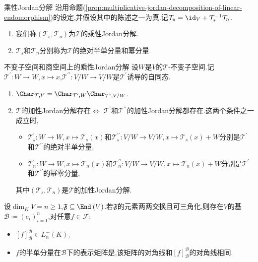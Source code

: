 \begin{definition}{乘性Jordan分解}{}
	沿用命题(\ref{prop:multiplicative-jordan-decomposition-of-linear-endomorphism})的设定,并假设其中的陈述之一为真.记$\mathcal{T}_{u}=\id_{V}+\mathcal{T}_{s}^{-1}\mathcal{T}_{n}$.
	\begin{enumerate}
		\item 我们称$\left(\mathcal{T}_{s},\mathcal{T}_{u}\right)$为$\mathcal{T}$的乘性Jordan分解.
		\item $\mathcal{T}_{s}$和$\mathcal{T}_{n}$分别称为$\mathcal{T}$的绝对半单分量和幂分量.
	\end{enumerate}
\end{definition}

\begin{proposition}{不变子空间和商空间上的乘性Jordan分解}{}
	设$W$是$V$的$\mathcal{T}$-不变子空间.记$\mathcal{T}^{\prime}:W\to W,x\mapsto x$,$\mathcal{T}^{\prime\prime}:V/W\to V/W$是$\mathcal{T}^{\prime}$诱导的自同态.
	\begin{enumerate}
		\item $\Char_{\mathcal{T},V}=\Char_{\mathcal{T}^{\prime},W}\Char_{\mathcal{T}^{\prime},V/W}$.
		\item $\mathcal{T}$的加性Jordan分解存在$\iff$ $\mathcal{T}^{\prime}$和$\mathcal{T}^{\prime\prime}$的加性Jordan分解都存在.这两个条件之一成立时,
		\begin{itemize}
			\item $\mathcal{T}_{s}^{\prime}:W\to W,x\mapsto\mathcal{T}_{s}\left(x\right)$和$\mathcal{T}_{s}^{\prime\prime}:V/W\to V/W,x\mapsto\mathcal{T}_{s}\left(x\right)+W$分别是$\mathcal{T}^{\prime}$和$\mathcal{T}^{\prime\prime}$的绝对半单分量,
			\item $\mathcal{T}_{n}^{\prime}:W\to W,x\mapsto\mathcal{T}_{n}\left(x\right)$和$\mathcal{T}_{n}^{\prime\prime}:V/W\to V/W,x\mapsto\mathcal{T}_{n}\left(x\right)+W$分别是$\mathcal{T}^{\prime}$和$\mathcal{T}^{\prime\prime}$的幂零分量,
		\end{itemize}
		其中$\left(\mathcal{T}_{s},\mathcal{T}_{n}\right)$是$\mathcal{T}$的加性Jordan分解.
	\end{enumerate}
\end{proposition}

\begin{proposition}{}{}
	设$\dim_{K}V=n\geq 1$,$\mathfrak{F}\subseteq\End_{}\left(V\right)$.若$\mathfrak{F}$的元素两两交换且可三角化,则存在$V$的基$\mathcal{B}\coloneq\left(e_{i}\right)_{i=1}^{n}$,对任意$ f\in\mathcal{F}$:
	\begin{itemize}
		\item $\left[f\right]_{\mathcal{B}}^{\mathcal{B}}\in L_{n}^{-}\left(K\right)$,
		\item $f$的半单分量在$\mathcal{B}$下的表示矩阵是,该矩阵的对角线和$\left[f\right]_{\mathcal{B}}^\mathcal{B}$的对角线相同.
	\end{itemize}
\end{proposition}
